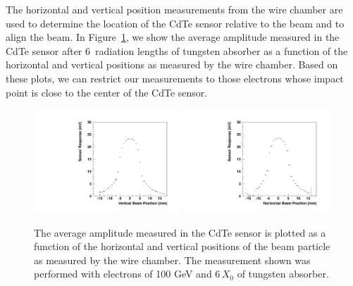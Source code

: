 The horizontal and vertical position measurements from the wire chamber are used to determine the location
of the CdTe sensor relative to the beam and to align the beam. In 
Figure~\ref{fig:BeamSensorPosition}, we show the average amplitude measured in the
CdTe sensor after $6$~radiation lengths of tungsten absorber
as a function of the horizontal and vertical positions as measured by the wire chamber. Based
on these plots, we can restrict our measurements to those electrons whose impact point is close
to the center of the CdTe sensor.

\begin{figure}[htbp] 
\centering
\includegraphics[width=0.49\textwidth]{figures/CdTeProfile_X.pdf} 
\includegraphics[width=0.49\textwidth]{figures/CdTeProfile_Y.pdf} 
\caption{The average amplitude measured in the CdTe sensor is plotted as a function of 
the horizontal and vertical positions of the beam particle as measured by the wire chamber. The measurement shown was performed with electrons of 100 GeV and $6\, X_0$ of tungsten absorber.} 
\label{fig:BeamSensorPosition} 
\end{figure} 


